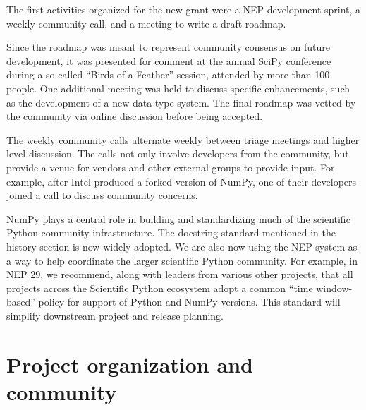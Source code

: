 The first activities organized for the new grant were a NEP development
sprint, a weekly community call, and a meeting to write a draft roadmap.

Since the roadmap was meant to represent community consensus on future
development, it was presented for comment at the annual SciPy
conference during a so-called ``Birds of a Feather'' session, attended
by more than 100 people.  One additional meeting was held to discuss
specific enhancements, such as the development of a new data-type
system.  The final roadmap was vetted by the community via online
discussion before being accepted.

The weekly community calls alternate weekly between triage meetings and
higher level discussion.  The calls not only involve developers from
the community, but provide a venue for vendors and other external
groups to provide input.  For example, after Intel produced a forked
version of NumPy, one of their developers joined a call to discuss
community concerns.

NumPy plays a central role in building and standardizing much of the scientific
Python community infrastructure.
The docstring standard mentioned in the history section is now widely adopted.
We are also now using the NEP system as a way to help coordinate the larger
scientific Python community.
For example, in NEP 29, we recommend, along with leaders from various other
projects, that all projects across the Scientific Python ecosystem adopt a
common ``time window-based'' policy for support of Python and NumPy versions.
This standard will simplify downstream project and release planning.



\section*{Project organization and community}

